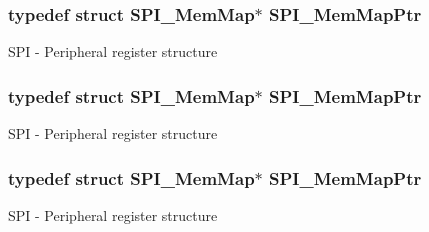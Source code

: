 \subsubsection[{\texorpdfstring{S\+P\+I\+\_\+\+Mem\+Map\+Ptr}{SPI_MemMapPtr}}]{\setlength{\rightskip}{0pt plus 5cm}typedef struct {\bf S\+P\+I\+\_\+\+Mem\+Map}$\ast$ {\bf S\+P\+I\+\_\+\+Mem\+Map\+Ptr}}\hypertarget{group___s_p_i___peripheral_ga7e4e9921e4d56bdbb10a04e77743ff5e}{}\label{group___s_p_i___peripheral_ga7e4e9921e4d56bdbb10a04e77743ff5e}
S\+PI -\/ Peripheral register structure 
\subsubsection[{\texorpdfstring{S\+P\+I\+\_\+\+Mem\+Map\+Ptr}{SPI_MemMapPtr}}]{\setlength{\rightskip}{0pt plus 5cm}typedef struct {\bf S\+P\+I\+\_\+\+Mem\+Map}$\ast$ {\bf S\+P\+I\+\_\+\+Mem\+Map\+Ptr}}\hypertarget{group___s_p_i___peripheral_ga7e4e9921e4d56bdbb10a04e77743ff5e}{}\label{group___s_p_i___peripheral_ga7e4e9921e4d56bdbb10a04e77743ff5e}
S\+PI -\/ Peripheral register structure 
\subsubsection[{\texorpdfstring{S\+P\+I\+\_\+\+Mem\+Map\+Ptr}{SPI_MemMapPtr}}]{\setlength{\rightskip}{0pt plus 5cm}typedef struct {\bf S\+P\+I\+\_\+\+Mem\+Map}$\ast$ {\bf S\+P\+I\+\_\+\+Mem\+Map\+Ptr}}\hypertarget{group___s_p_i___peripheral_ga7e4e9921e4d56bdbb10a04e77743ff5e}{}\label{group___s_p_i___peripheral_ga7e4e9921e4d56bdbb10a04e77743ff5e}
S\+PI -\/ Peripheral register structure 